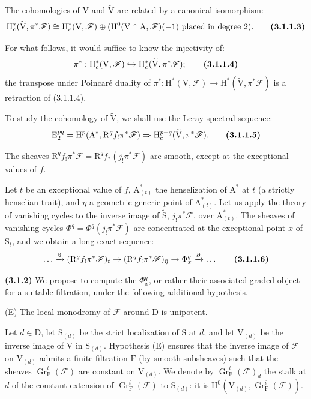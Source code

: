 \documentclass[11pt,leqno]{article}
\begin{document}
The cohomologies of \(\mathrm V\) and \(\widetilde{\mathrm V}\) are related by a canonical isomorphism:
\[
\mathrm H_c^*(\widetilde{\mathrm V},\pi^*\mathscr F)
\cong
\mathrm H_c^*(\mathrm V,\mathscr F)
\oplus
(\mathrm H^0(\mathrm V\cap\mathrm A,\mathscr F)(-1)
 \text{ placed in degree }2).
\tag*{\textbf{(3.1.1.3)}}
\]

For what follows, it would suffice to know the injectivity of:
\[
\pi^*:\mathrm H_c^*(\mathrm V,\mathscr F)
\hookrightarrow
\mathrm H_c^*(\widetilde{\mathrm V},\pi^*\mathscr F);
\tag*{\textbf{(3.1.1.4)}}
\]
the transpose under Poincaré duality of \(\pi^*:\mathrm H^*(\mathrm V,\mathscr F)\to\mathrm H^*(\widetilde{\mathrm V},\pi^*\mathscr F)\) is a retraction of (3.1.1.4).

To study the cohomology of \(\widetilde{\mathrm V}\), we shall use the Leray spectral sequence:
\[
\mathrm E_2^{pq}
=\mathrm H^p(\mathrm A^*,\mathrm R^qf_!\pi^*\mathscr F)
\Rightarrow
\mathrm H_c^{p+q}(\widetilde{\mathrm V},\pi^*\mathscr F).
\tag*{\textbf{(3.1.1.5)}}
\]

The sheaves \(\mathrm R^qf_!\pi^*\mathscr F=\mathrm R^qf_*(j_!\pi^*\mathscr F)\) are smooth, except at the exceptional values of \(f\).

Let \(t\) be an exceptional value of \(f\), \(\mathrm A^*_{(t)}\) the henselization of \(\mathrm A^*\) at \(t\) (a strictly henselian trait), and \(\bar{\eta}\) a geometric generic point of \(\mathrm A^*_{(t)}\). Let us apply the theory of vanishing cycles to the inverse image of \(\widetilde{\mathrm S}\), \(j_!\pi^*\mathscr F\), over \(\mathrm A^*_{(t)}\). The sheaves of vanishing cycles \(\Phi^q=\Phi^q(j_!\pi^*\mathscr F)\) are concentrated at the exceptional point \(x\) of \(\mathrm S_t\), and we obtain a long exact sequence:
\[
\ldots\xrightarrow{\partial}
(\mathrm R^qf_!\pi^*\mathscr F)_t
\to
(\mathrm R^qf_!\pi^*\mathscr F)_{\bar{\eta}}
\to\Phi_x^q\xrightarrow{\partial}\ldots
\tag*{\textbf{(3.1.1.6)}}
\]

\textbf{(3.1.2)} We propose to compute the \(\Phi_x^q\), or rather their associated graded object for a suitable filtration, under the following additional hypothesis.

(E) The local monodromy of \(\mathscr F\) around \(\mathrm D\) is unipotent.

Let \(d\in\mathrm D\), let \(\mathrm S_{(d)}\) be the strict localization of \(\mathrm S\) at \(d\), and let \(\mathrm V_{(d)}\) be the inverse image of \(\mathrm V\) in \(\mathrm S_{(d)}\). Hypothesis (E) ensures that the inverse image of \(\mathscr F\) on \(\mathrm V_{(d)}\) admits a finite filtration \(\mathrm F\) (by smooth subsheaves) such that the sheaves \(\operatorname{Gr}_{\mathrm F}^i(\mathscr F)\) are constant on \(\mathrm V_{(d)}\). We denote by \(\operatorname{Gr}_{\mathrm F}^i(\mathscr F)_d\) the stalk at \(d\) of the constant extension of \(\operatorname{Gr}_{\mathrm F}^i(\mathscr F)\) to \(\mathrm S_{(d)}\): it is \(\mathrm H^0(\mathrm V_{(d)},\operatorname{Gr}_{\mathrm F}^i(\mathscr F))\).
\end{document}
